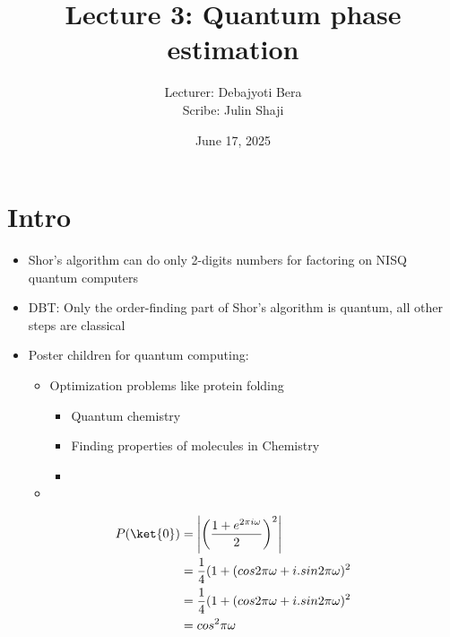 \documentclass[12pt]{article}
\begin{document}
\title{Lecture 3: Quantum phase estimation}
\author{Lecturer: Debajyoti Bera\\ Scribe: Julin Shaji}
\date{June 17, 2025}
\maketitle

\section{Intro}
\begin{itemize}
\item
  Shor's algorithm can do only 2-digits numbers for factoring on
  NISQ quantum computers
\item
  DBT: Only the order-finding part of Shor's algorithm is quantum, all
  other steps are classical
\item Poster children for quantum computing:
  \begin{itemize}
  \item Optimization problems like protein folding
    \begin{itemize}
    \item Quantum chemistry
    \item Finding properties of molecules in Chemistry
    \item 
    \end{itemize}
  \item 
  \end{itemize}
\end{itemize}

\begin{align*}
 P(\ket{0})
  &= 
    \left|
    \left(
      \frac{1 + e^{2\pi i \omega}}{2}
    \right)^2
    \right| \\
  &= 
    \frac{1}{4}(1 + (cos2\pi\omega + i.sin2\pi\omega)^2 \\
  &= 
    \frac{1}{4}(1 + (cos2\pi\omega + i.sin2\pi\omega)^2 \\
  &= 
     cos^2\pi\omega
\end{align*}
\end{document}
